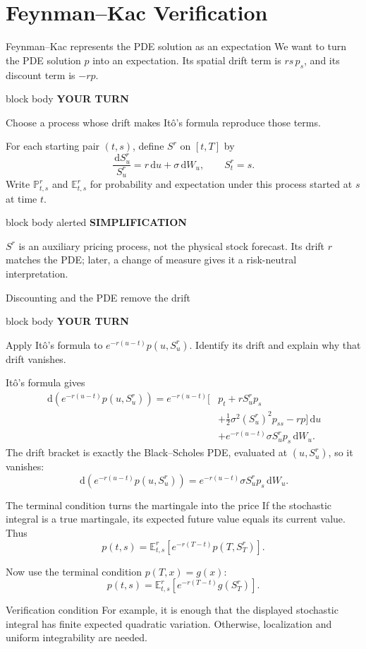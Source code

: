 \documentclass[handout,10pt,aspectratio=169]{beamer}
\newenvironment{simplificationbox}{%
  \begin{beamercolorbox}[rounded=true,sep=0.7em,wd=\textwidth]{block body alerted}
  \textbf{\color{CourseRed}SIMPLIFICATION}\quad
}{\end{beamercolorbox}}
\newenvironment{pausebox}{%
  \begin{beamercolorbox}[rounded=true,sep=0.8em,wd=\textwidth]{block body}
  \textbf{\color{CourseGold}YOUR TURN}\quad
}{\end{beamercolorbox}}
\newcommand{\dd}{\,\mathrm d}
\newcommand{\E}{\mathbb E}
\newcommand{\Pp}{\mathbb P}
\newcommand{\1}{\mathbf 1}
\begin{document}
\section{Feynman--Kac Verification}

\begin{frame}{Feynman--Kac represents the PDE solution as an expectation}
\small
We want to turn the PDE solution \(p\) into an expectation. Its spatial
drift term is \(rs\,p_s\), and its discount term is \(-rp\).
\begin{pausebox}
Choose a process whose drift makes It\^o's formula reproduce those terms.
\end{pausebox}

For each starting pair \((t,s)\), define \(S^r\) on \([t,T]\) by
\[
\frac{\dd S_u^r}{S_u^r}=r\dd u+\sigma\dd W_u,
\qquad S_t^r=s.
\]
Write \(\Pp^r_{t,s}\) and \(\E^r_{t,s}\) for probability and expectation
under this process started at \(s\) at time \(t\).
\begin{simplificationbox}
\(S^r\) is an auxiliary pricing process, not the physical stock forecast.
Its drift \(r\) matches the PDE; later, a change of measure gives it a
risk-neutral interpretation.
\end{simplificationbox}
\end{frame}

\begin{frame}{Discounting and the PDE remove the drift}
\small
\begin{pausebox}
Apply It\^o's formula to \(e^{-r(u-t)}p(u,S_u^r)\). Identify its drift
and explain why that drift vanishes.
\end{pausebox}

It\^o's formula gives
\[
\begin{aligned}
\dd\!\left(e^{-r(u-t)}p(u,S_u^r)\right)
=e^{-r(u-t)}
\bigg[&p_t+rS_u^{r}p_s\\
&+\frac12\sigma^2(S_u^{r})^2p_{ss}-rp\bigg]\dd u\\
&+e^{-r(u-t)}\sigma S_u^{r}p_s\dd W_u.
\end{aligned}
\]
The drift bracket is exactly the Black--Scholes PDE, evaluated at
\((u,S_u^r)\), so it vanishes:
\[
\boxed{
\dd\!\left(e^{-r(u-t)}p(u,S_u^r)\right)
=e^{-r(u-t)}\sigma S_u^rp_s\dd W_u.}
\]
\end{frame}

\begin{frame}{The terminal condition turns the martingale into the price}
If the stochastic integral is a true martingale, its expected future value
equals its current value. Thus
\[
p(t,s)
=\E^r_{t,s}\!\left[
e^{-r(T-t)}p(T,S_T^{r})
\right].
\]

Now use the terminal condition \(p(T,x)=g(x)\):
\[
\boxed{
p(t,s)
=\E^r_{t,s}\!\left[
e^{-r(T-t)}g(S_T^{r})
\right].}
\]
\begin{alertblock}{Verification condition}
For example, it is enough that the displayed stochastic integral has finite
expected quadratic variation. Otherwise, localization and uniform
integrability are needed.
\end{alertblock}
\end{frame}
\end{document}
